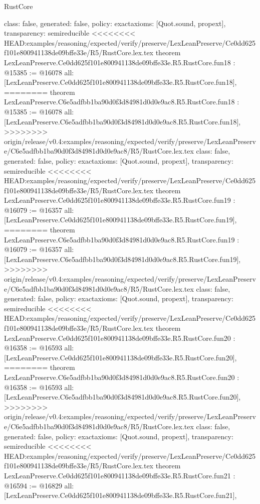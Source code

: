 \begin{lexlean}{RustCore}
\begin{coremodule}
{\begin{coremodule}
{{{{{{{{{{{{{{{{{{{{{  class: false,
  generated: false,
  policy: exact{axioms: [Quot.sound, propext]},
  transparency: semireducible
}
<<<<<<<< HEAD:examples/reasoning/expected/verify/preserve/LexLeanPreserve/Ce0dd625f101e800941138de09bffe33e/R5/RustCore.lex.tex
theorem LexLeanPreserve.Ce0dd625f101e800941138de09bffe33e.R5.RustCore.fun18 : @15385 := @16078 {
  all: [LexLeanPreserve.Ce0dd625f101e800941138de09bffe33e.R5.RustCore.fun18],
========
theorem LexLeanPreserve.C6e5adfbb1ba90d0f3d84981d0d0e9ac8.R5.RustCore.fun18 : @15385 := @16078 {
  all: [LexLeanPreserve.C6e5adfbb1ba90d0f3d84981d0d0e9ac8.R5.RustCore.fun18],
>>>>>>>> origin/release/v0.4:examples/reasoning/expected/verify/preserve/LexLeanPreserve/C6e5adfbb1ba90d0f3d84981d0d0e9ac8/R5/RustCore.lex.tex
  class: false,
  generated: false,
  policy: exact{axioms: [Quot.sound, propext]},
  transparency: semireducible
}
<<<<<<<< HEAD:examples/reasoning/expected/verify/preserve/LexLeanPreserve/Ce0dd625f101e800941138de09bffe33e/R5/RustCore.lex.tex
theorem LexLeanPreserve.Ce0dd625f101e800941138de09bffe33e.R5.RustCore.fun19 : @16079 := @16357 {
  all: [LexLeanPreserve.Ce0dd625f101e800941138de09bffe33e.R5.RustCore.fun19],
========
theorem LexLeanPreserve.C6e5adfbb1ba90d0f3d84981d0d0e9ac8.R5.RustCore.fun19 : @16079 := @16357 {
  all: [LexLeanPreserve.C6e5adfbb1ba90d0f3d84981d0d0e9ac8.R5.RustCore.fun19],
>>>>>>>> origin/release/v0.4:examples/reasoning/expected/verify/preserve/LexLeanPreserve/C6e5adfbb1ba90d0f3d84981d0d0e9ac8/R5/RustCore.lex.tex
  class: false,
  generated: false,
  policy: exact{axioms: [Quot.sound, propext]},
  transparency: semireducible
}
<<<<<<<< HEAD:examples/reasoning/expected/verify/preserve/LexLeanPreserve/Ce0dd625f101e800941138de09bffe33e/R5/RustCore.lex.tex
theorem LexLeanPreserve.Ce0dd625f101e800941138de09bffe33e.R5.RustCore.fun20 : @16358 := @16593 {
  all: [LexLeanPreserve.Ce0dd625f101e800941138de09bffe33e.R5.RustCore.fun20],
========
theorem LexLeanPreserve.C6e5adfbb1ba90d0f3d84981d0d0e9ac8.R5.RustCore.fun20 : @16358 := @16593 {
  all: [LexLeanPreserve.C6e5adfbb1ba90d0f3d84981d0d0e9ac8.R5.RustCore.fun20],
>>>>>>>> origin/release/v0.4:examples/reasoning/expected/verify/preserve/LexLeanPreserve/C6e5adfbb1ba90d0f3d84981d0d0e9ac8/R5/RustCore.lex.tex
  class: false,
  generated: false,
  policy: exact{axioms: [Quot.sound, propext]},
  transparency: semireducible
}
<<<<<<<< HEAD:examples/reasoning/expected/verify/preserve/LexLeanPreserve/Ce0dd625f101e800941138de09bffe33e/R5/RustCore.lex.tex
theorem LexLeanPreserve.Ce0dd625f101e800941138de09bffe33e.R5.RustCore.fun21 : @16594 := @16829 {
  all: [LexLeanPreserve.Ce0dd625f101e800941138de09bffe33e.R5.RustCore.fun21],
}}}}}}}}}}}}}}}}}}}}}}}}
\end{coremodule}}
\end{coremodule}
\end{lexlean}
